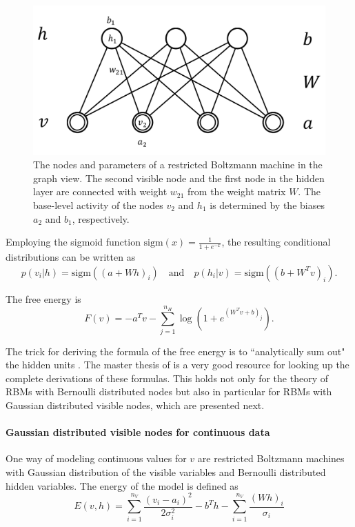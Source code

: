 \documentclass[12pt]{article}
\newcommand{\sigm}{\mathrm{sigm}}
\begin{document}
\begin{figure}[h]
   \centering
   \includegraphics[scale=0.5]{images/rbmweights.pdf}
   \caption{The nodes and parameters of a restricted Boltzmann machine in the graph view. The second visible node and the first node in the hidden layer are connected with weight $w_{21}$ from the weight matrix $W$. The base-level activity of the nodes $v_2$ and $h_1$ is determined by the biases $a_2$ and $b_1$, respectively.}
   \label{fig:rbmweights}
 \end{figure}


Employing the sigmoid function $\sigm(x) = \frac{1}{1+ e^{-x}}$, the resulting conditional distributions can be written as 
\begin{equation}
p(v_i | h) = \sigm ((a + W h)_i)
 \quad \text{and}\quad 
p(h_i | v) = \sigm ((b + W^T v)_i).
\label{eqn:condprobrbm}
\end{equation}

The free energy is
\begin{equation}
F(v) = - a^T v - \sum_{j=1}^{n_H} \log \left (1 + e^{(W^T v + b)_j}\right).
\label{eqn:freenergy_rbm}
\end{equation}

The trick for deriving the formula of the free energy is to ``analytically sum out" the hidden units \citep{sala2012anefficient}.
The master thesis of \cite{krizhevsky2009tinyimagesthesis} is a very good resource for looking up the complete derivations of these formulas. This holds not only for the theory of RBMs with Bernoulli distributed nodes but also in particular for RBMs with Gaussian distributed visible nodes, which are presented next.

\paragraph{Gaussian distributed visible nodes for continuous data}\label{gaussianrbm}
One way of modeling continuous values for $v$ are restricted Boltzmann machines with Gaussian distribution of the visible variables and Bernoulli distributed hidden variables. The energy of the model is defined as
\begin{equation}
   E(v,h) = \sum_{i=1}^{n_V}\frac{(v_i - a_i)^2}{2\sigma_i^2} - b^T h - \sum_{i=1}^{n_V} \frac{(Wh)_i}{\sigma_i}
   \label{eqn:energyformulagbrbm}
\end{equation}
\end{document}
